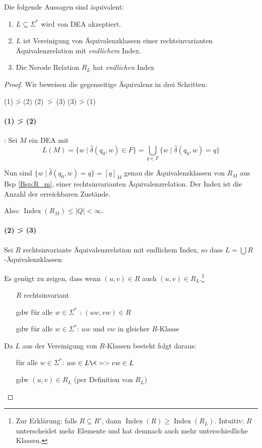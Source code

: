 \begin{Satz}[Nerode] %
	Die folgende Aussagen sind äquivalent:
	\begin{enumerate}
		\item\label{itm:Nerode1} $L\subseteq \Sigma^*$ wird von \ac{DEA} akzeptiert.
		\item\label{itm:Nerode2} $L$ ist Vereinigung von Äquivalenzklassen einer rechtsinvarianten Äquivalenzrelation mit \emph{endlichem} Index.
		\item\label{itm:Nerode3} Die Nerode Relation $R_L$ hat \emph{endlichen} Index
	\end{enumerate}
\end{Satz}

\begin{proof}
  Wir beweisen die gegenseitige Äquivalenz in drei Schritten:

  \begin{center}
    (1) \=> (2) \quad \mbox{(2) \=> (3)} \quad (3) \=> (1)
  \end{center}

	\paragraph{(1) \=> (2)}: Sei $M$ ein \ac{DEA} mit
  \begin{displaymath}
    L(M)=\{w \mid \hat\delta(q_0,w)\in F \} = \bigcup_{q \in F} \{ w \mid \hat\delta(q_0,w) = q\}
\end{displaymath}

Nun sind $\{ w \mid \hat\delta(q_0,w)=q \} = [q]_M$ genau die Äquivalenzklassen von $R_M$ aus Bsp \ref{Bsp:R_m}, einer rechtsinvarianten Äquivalenzrelation.
Der Index ist die Anzahl der erreichbaren Zustände.

Also: $\operatorname{Index}(R_M) \le |Q| < \infty$.
	
\paragraph{(2) \=> (3)} Sei $R$ rechtsinvariante Äquivalenzrelation mit endlichem Index, so dass $L=\bigcup R$-Äquivalenzklassen
	
Es genügt zu zeigen, dass wenn $(u,v)\in R$ auch $(u,v)\in R_L $.\footnote{
Zur Erklärung: falls $R \subseteq R'$, dann $\operatorname{Index}(R) \ge \operatorname{Index}(R_L)$.
Intuitiv: $R$ unterscheidet mehr Elemente und hat demnach auch mehr unterschiedliche Klassen.}

\begin{itemize}
\item[] $R$ rechtsinvariant
\item[gdw] für alle  $w\in\Sigma^*$ : $(uw,vw)\in R$ 
\item[gdw] für alle $w\in\Sigma^*$: $uw\text{ und $vw$ in gleicher $R$-Klasse}$
\end{itemize}
Da $L$ aus der Vereinigung von $R$-Klassen besteht folgt daraus:
\begin{itemize}
  \item[] für alle $w\in\Sigma^*$: $uw\in L\<=>vw\in L$
  \item[gdw] $(u, v) \in R_L$ (per Definition von $R_L$)
\end{itemize}


\end{proof}
